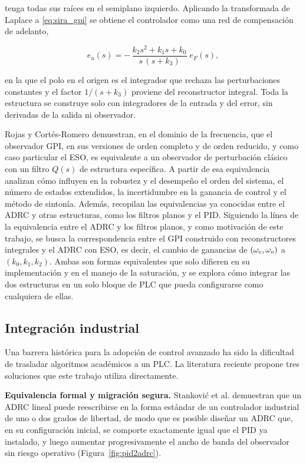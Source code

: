 tenga todas sus raíces en el semiplano izquierdo. Aplicando la transformada de
Laplace a \eqref{eq:sira_gpi} se obtiene el controlador como una red de
compensación de adelanto,

\begin{equation}
    e_u(s) = -\,\frac{k_2 s^{2} + k_1 s + k_0}{s\,(s + k_3)}\; e_F(s) ,
    \label{eq:sira_tf}
\end{equation}

en la que el polo en el origen es el integrador que rechaza las
perturbaciones constantes y el factor $1/(s+k_3)$ proviene del reconstructor
integral. Toda la estructura se construye solo con integradores de la entrada
y del error, sin derivadas de la salida ni observador.

Rojas y Cortés-Romero \cite{rojas2020equivalence} demuestran, en el dominio
de la frecuencia, que el observador GPI, en sus versiones de orden completo y
de orden reducido, y como caso particular el ESO, es equivalente a un
observador de perturbación clásico con un filtro $Q(s)$ de estructura
específica. A partir de esa equivalencia analizan cómo influyen en la robustez
y el desempeño el orden del sistema, el número de estados extendidos, la
incertidumbre en la ganancia de control y el método de sintonía. Además,
recopilan las equivalencias ya conocidas entre el ADRC y otras estructuras,
como los filtros planos y el PID. Siguiendo la línea de la equivalencia entre
el ADRC y los filtros planos, y como motivación de este trabajo, se busca la correspondencia entre el GPI construido con
reconstructores integrales y el ADRC con ESO, es decir, el cambio de
ganancias de $(\omega_{c},\omega_{o})$ a $(k_0,k_1,k_2)$. Ambas son formas
equivalentes que solo difieren en su implementación y en el manejo de la
saturación, y se explora cómo integrar las dos estructuras en un solo bloque de
PLC que pueda configurarse como cualquiera de ellas.

\subsection{Integración industrial}

Una barrera histórica para la adopción de control avanzado ha sido la
dificultad de trasladar algoritmos académicos a un PLC. La literatura reciente
propone tres soluciones que este trabajo utiliza directamente.

\textbf{Equivalencia formal y migración segura.} Stankovi\'c et al.
\cite{stankovic2024pid} demuestran que un ADRC lineal puede reescribirse en la
forma estándar de un controlador industrial de uno o dos grados de libertad, de
modo que es posible diseñar un ADRC que, en su configuración inicial, se
comporte exactamente igual que el PID ya instalado, y luego aumentar
progresivamente el ancho de banda del observador sin riesgo operativo
(Figura~\ref{fig:pid2adrc}).

